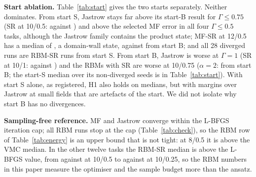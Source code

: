 \textbf{Start ablation.} Table~\ref{tab:start} gives the two starts separately. Neither dominates. From start S, Jastrow stays far above its start-B result for $\Gamma\le0.75$ (SR at 10/0.5:  against ) and above the selected MF error in all four $\Gamma\le0.5$ tasks, although the Jastrow family contains the product state; MF-SR at 12/0.5 has a median of , a domain-wall state, against  from start B; and all 28 diverged runs are RBM-SR runs from start S. From start B, Jastrow is worse at $\Gamma{=}1$ (SR at 10/1:  against ) and the RBMs with SR are worse at 10/0.75 ($\alpha{=}2$:  from start B; the start-S median over its non-diverged seeds is in Table~\ref{tab:start}). With start S alone, as registered, H1 also holds on medians, but with margins over Jastrow at small fields that are artefacts of the start. We did not isolate why start B has no divergences.

\begin{table}[t]\centering\caption{Start ablation: median $\epsilon_E$ over the non-diverged seeds of each start (S: symmetric, B: symmetry-broken; superscript: diverged seeds of 5); columns are $N/\Gamma$. SR systems only, for space.}\label{tab:start}\footnotesize\setlength{\tabcolsep}{3pt}\end{table}

\textbf{Sampling-free reference.} MF and Jastrow converge within the L-BFGS iteration cap; all RBM runs stop at the cap (Table~\ref{tab:check}), so the RBM row of Table~\ref{tab:energy} is an upper bound that is not tight: at 8/0.5 it is above the VMC median. In the other twelve tasks the RBM-SR median is above the L-BFGS value, from  against  at 10/0.5 to  against  at 10/0.25, so the RBM numbers in this paper measure the optimiser and the sample budget more than the ansatz.

